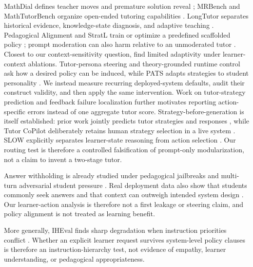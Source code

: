 \documentclass[11pt]{article}
\begin{document}
MathDial defines teacher moves and premature solution reveal
\citep{macina-etal-2023-mathdial}; MRBench and MathTutorBench organize open-ended
tutoring capabilities
\citep{maurya-etal-2025-mrbench,macina-etal-2025-mathtutorbench}. LongTutor
separates historical evidence, knowledge-state diagnosis, and adaptive teaching
\citep{li-etal-2026-longtutor}. Pedagogical Alignment and StratL train or optimize
a predefined scaffolded policy \citep{sonkar-etal-2024-pedagogical,puech-etal-2025-steering};
prompt moderation can also harm relative to an unmoderated tutor
\citep{steindl-etal-2025-prompt}. Closest to our context-sensitivity question,
\citet{borchers-shou-2025-adaptivity} find limited adaptivity under learner-context
ablations. Tutor-persona steering \citep{lee-etal-2026-tutor-personas} and
theory-grounded runtime control \citep{nkambou-etal-2026-pedrag} ask how a desired
policy can be induced, while PATS adapts strategies to student personality
\citep{rooein-etal-2026-pats}. We instead measure recurring deployed-system
defaults, audit their construct validity, and then apply the same intervention.
Work on tutor-strategy prediction \citep{ikram-etal-2025-strategy} and feedback
failure localization \citep{yasir-etal-2026-feedback} further motivates reporting
action-specific errors instead of one aggregate tutor score.
Strategy-before-generation is itself established: prior work jointly predicts
tutor strategies and responses \citep{wang-etal-2023-strategize}, while Tutor
CoPilot deliberately retains human strategy selection in a live system
\citep{wang-etal-2025-tutor-copilot}. SLOW explicitly separates learner-state
reasoning from action selection \citep{wei-etal-2026-slow}. Our routing test is
therefore a controlled falsification of prompt-only modularization, not a claim
to invent a two-stage tutor.

Answer withholding is already studied under pedagogical jailbreaks and
multi-turn adversarial student pressure
\citep{zhao-etal-2026-shape,zhao-etal-2026-answer-leakage}. Real deployment data
also show that students commonly seek answers and that context can outweigh
intended system design \citep{kobler-etal-2026-students}. Our learner-action
analysis is therefore not a first leakage or steering claim, and policy alignment
is not treated as learning benefit.

More generally, IHEval finds sharp degradation when instruction priorities
conflict \citep{zhang-etal-2025-iheval}. Whether an explicit learner request
survives system-level policy clauses is therefore an instruction-hierarchy test,
not evidence of empathy, learner understanding, or pedagogical appropriateness.
\end{document}
